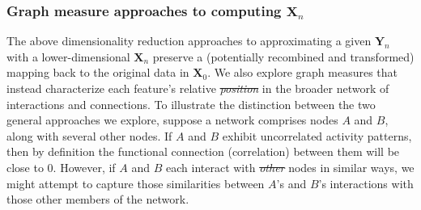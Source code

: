 \documentclass[english]{article}
\providecommand{\DIFaddtex}[1]{{\protect\color{blue}\uwave{#1}}} %
\providecommand{\DIFdeltex}[1]{{\protect\color{red}\sout{#1}}}                      %
\providecommand{\DIFaddbegin}{} %
\providecommand{\DIFaddend}{} %
\providecommand{\DIFdelbegin}{} %
\providecommand{\DIFdelend}{} %
\providecommand{\DIFadd}[1]{\texorpdfstring{\DIFaddtex{#1}}{#1}} %
\providecommand{\DIFdel}[1]{\texorpdfstring{\DIFdeltex{#1}}{}} %
\newcommand{\DIFscaledelfig}{0.5}
\newlength{\DIFdelgraphicswidth} %
\newlength{\DIFdelgraphicsheight} %
\newcommand{\DIFaddincludegraphics}[2][]{{\color{blue}\fbox{\DIFOincludegraphics[#1]{#2}}}} %
\newcommand{\DIFdelincludegraphics}[2][]{%
\sbox{\DIFdelgraphicsbox}{\DIFOincludegraphics[#1]{#2}}%
\settoboxwidth{\DIFdelgraphicswidth}{\DIFdelgraphicsbox} %
\settoboxtotalheight{\DIFdelgraphicsheight}{\DIFdelgraphicsbox} %
\scalebox{\DIFscaledelfig}{%
\parbox[b]{\DIFdelgraphicswidth}{\usebox{\DIFdelgraphicsbox}\\[-\baselineskip] \rule{\DIFdelgraphicswidth}{0em}}\llap{\resizebox{\DIFdelgraphicswidth}{\DIFdelgraphicsheight}{%
\setlength{\unitlength}{\DIFdelgraphicswidth}%
\begin{picture}(1,1)%
\thicklines\linethickness{2pt} %
{\color[rgb]{1,0,0}\put(0,0){\framebox(1,1){}}}%
{\color[rgb]{1,0,0}\put(0,0){\line( 1,1){1}}}%
{\color[rgb]{1,0,0}\put(0,1){\line(1,-1){1}}}%
\end{picture}%
}\hspace*{3pt}}} %
} %
\DeclareRobustCommand{\DIFaddbegin}{\DIFOaddbegin \let\includegraphics\DIFaddincludegraphics} %
\DeclareRobustCommand{\DIFaddend}{\DIFOaddend \let\includegraphics\DIFOincludegraphics} %
\DeclareRobustCommand{\DIFdelbegin}{\DIFOdelbegin \let\includegraphics\DIFdelincludegraphics} %
\DeclareRobustCommand{\DIFdelend}{\DIFOaddend \let\includegraphics\DIFOincludegraphics} %
\begin{document}
\subsubsection*{Graph measure approaches to computing
  $\mathbf{X}_n$}
The above dimensionality reduction approaches to approximating a given
$\mathbf{Y}_n$ with a lower-dimensional $\mathbf{X}_n$ preserve a
(potentially recombined and transformed) mapping back to the original
data in $\mathbf{X}_0$.  We also explore graph measures that instead
characterize each feature's relative \DIFdelbegin \textit{\DIFdel{position}} %
\DIFdelend \DIFaddbegin \DIFadd{position }\DIFaddend in the broader
network of interactions and connections.  To illustrate the
distinction between the two general approaches we explore, suppose a
network comprises nodes $A$ and $B$, along with several other nodes.  If $A$ and $B$ exhibit
uncorrelated activity patterns, then by definition the functional connection
(correlation) between them will be close to 0.
However, if $A$ and $B$ each interact with \DIFdelbegin \textit{\DIFdel{other}} %
\DIFdelend \DIFaddbegin \DIFadd{other }\DIFaddend nodes in similar ways, we
might attempt to capture those similarities between $A$'s and $B$'s
interactions with those other members of the network.
\end{document}
